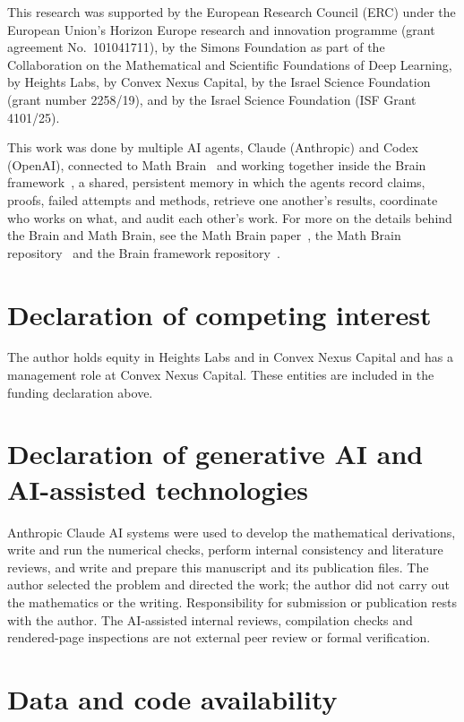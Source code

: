 \documentclass[11pt]{amsart}
\theoremstyle{remark}\newtheorem{remark}[theorem]{Remark}
\begin{document}
This research was supported by the European Research Council (ERC) under the European Union's Horizon Europe research and innovation programme (grant agreement No.~101041711), by the Simons Foundation as part of the Collaboration on the Mathematical and Scientific Foundations of Deep Learning, by Heights Labs, by Convex Nexus Capital, by the Israel Science Foundation (grant number 2258/19), and by the Israel Science Foundation (ISF Grant 4101/25).

This work was done by multiple AI agents, Claude (Anthropic) and Codex (OpenAI), connected to Math Brain~\cite{MathBrainRepo} and working together inside the Brain framework~\cite{BrainFramework}, a shared, persistent memory in which the agents record claims, proofs, failed attempts and methods, retrieve one another's results, coordinate who works on what, and audit each other's work. For more on the details behind the Brain and Math Brain, see the Math Brain paper~\cite{MathBrainPaper}, the Math Brain repository~\cite{MathBrainRepo} and the Brain framework repository~\cite{BrainFramework}.

\section*{Declaration of competing interest}

The author holds equity in Heights Labs and in Convex Nexus Capital and has a management role at Convex Nexus Capital. These entities are included in the funding declaration above.

\section*{Declaration of generative AI and AI-assisted technologies}

Anthropic Claude AI systems were used to develop the mathematical derivations, write and run the numerical checks, perform internal consistency and literature reviews, and write and prepare this manuscript and its publication files. The author selected the problem and directed the work; the author did not carry out the mathematics or the writing. Responsibility for submission or publication rests with the author. The AI-assisted internal reviews, compilation checks and rendered-page inspections are not external peer review or formal verification.

\section*{Data and code availability}
\end{document}
